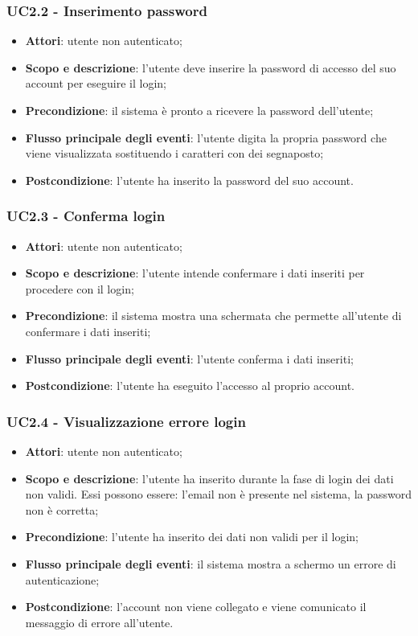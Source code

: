 \subsubsection{UC2.2 - Inserimento password}
\begin{itemize}
\item \textbf{Attori}: utente non autenticato;
\item \textbf{Scopo e descrizione}: l’utente deve inserire la password di accesso del suo account per eseguire il login;
\item \textbf{Precondizione}: il sistema è pronto a ricevere la password dell’utente;
\item \textbf{Flusso principale degli eventi}: l’utente digita la propria password che viene visualizzata sostituendo i caratteri con dei segnaposto;
\item \textbf{Postcondizione}: l’utente ha inserito la password del suo account.
\end{itemize}
\subsubsection{UC2.3 - Conferma login}
\begin{itemize}
\item \textbf{Attori}: utente non autenticato;
\item \textbf{Scopo e descrizione}: l’utente intende confermare i dati inseriti per procedere con il login;
\item \textbf{Precondizione}: il sistema mostra una schermata che permette all’utente di confermare i dati inseriti;
\item \textbf{Flusso principale degli eventi}: l’utente conferma i dati inseriti;
\item \textbf{Postcondizione}: l’utente ha eseguito l’accesso al proprio account.
\end{itemize}
\subsubsection{UC2.4 - Visualizzazione errore login}
\begin{itemize}
\item \textbf{Attori}: utente non autenticato;
\item \textbf{Scopo e descrizione}: l’utente ha inserito durante la fase di login dei dati non validi. Essi possono essere: l'email non è presente nel sistema, la password non è corretta;
\item \textbf{Precondizione}: l’utente ha inserito dei dati non validi per il login;
\item \textbf{Flusso principale degli eventi}: il sistema mostra a schermo un errore di autenticazione;
\item \textbf{Postcondizione}: l’account non viene collegato e viene comunicato il messaggio di errore all’utente.
\end{itemize}
